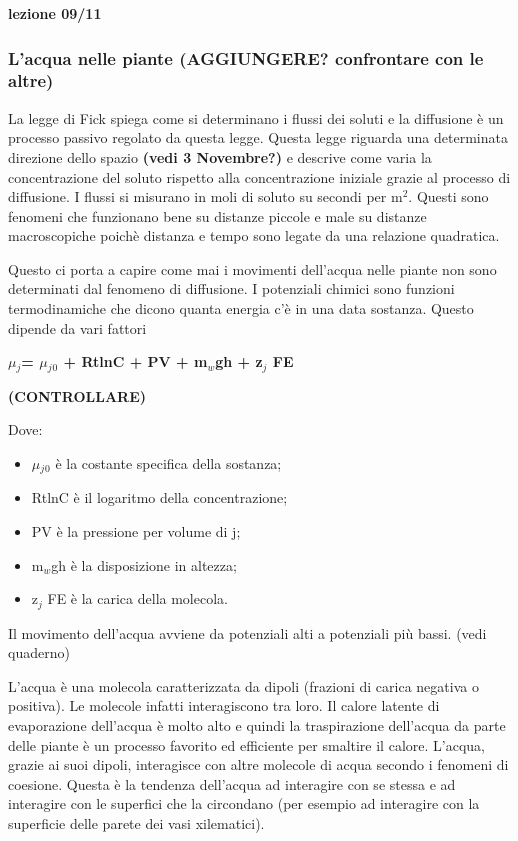 \documentclass[]{article}
\begin{document}
\textbf{lezione 09/11}

\subsubsection{L'acqua nelle piante (AGGIUNGERE? confrontare con le
altre)}\label{lacqua-nelle-piante-aggiungere-confrontare-con-le-altre}

La legge di Fick spiega come si determinano i flussi dei soluti e la
diffusione è un processo passivo regolato da questa legge. Questa legge
riguarda una determinata direzione dello spazio \textbf{(vedi 3
Novembre?)} e descrive come varia la concentrazione del soluto rispetto
alla concentrazione iniziale grazie al processo di diffusione. I flussi
si misurano in moli di soluto su secondi per m$^2$. Questi sono fenomeni
che funzionano bene su distanze piccole e male su distanze macroscopiche
poichè distanza e tempo sono legate da una relazione quadratica.

Questo ci porta a capire come mai i movimenti dell'acqua nelle piante
non sono determinati dal fenomeno di diffusione. I potenziali chimici
sono funzioni termodinamiche che dicono quanta energia c'è in una data
sostanza. Questo dipende da vari fattori

\textbf{$\mu$$_j$= $\mu$$_j$$_0$ + RtlnC + PV + m$_w$gh + z$_j$ FE}

\textbf{(CONTROLLARE)}

Dove:

\begin{itemize}
\itemsep1pt\parskip0pt
\item
  $\mu$$_j$$_0$ è la costante specifica della sostanza;
\item
  RtlnC è il logaritmo della concentrazione;
\item
  PV è la pressione per volume di j;
\item
  m$_w$gh è la disposizione in altezza;
\item
  z$_j$ FE è la carica della molecola.
\end{itemize}

Il movimento dell'acqua avviene da potenziali alti a potenziali più
bassi. (vedi quaderno)

L'acqua è una molecola caratterizzata da dipoli (frazioni di carica
negativa o positiva). Le molecole infatti interagiscono tra loro. Il
calore latente di evaporazione dell'acqua è molto alto e quindi la
traspirazione dell'acqua da parte delle piante è un processo favorito ed
efficiente per smaltire il calore. L'acqua, grazie ai suoi dipoli,
interagisce con altre molecole di acqua secondo i fenomeni di coesione.
Questa è la tendenza dell'acqua ad interagire con se stessa e ad
interagire con le superfici che la circondano (per esempio ad interagire
con la superficie delle parete dei vasi xilematici).
\end{document}
